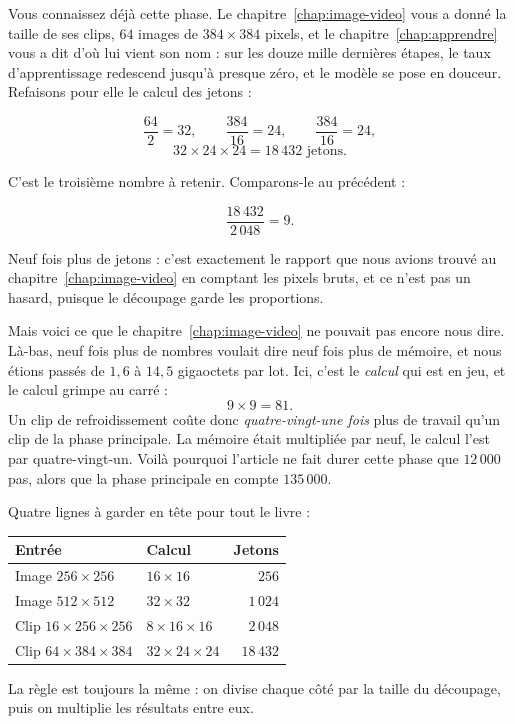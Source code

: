 \begin{exemple}
Vous connaissez déjà cette phase. Le chapitre~\ref{chap:image-video} vous a
donné la taille de ses clips, $64$ images de $384 \times 384$ pixels, et le
chapitre~\ref{chap:apprendre} vous a dit d'où lui vient son nom : sur les
douze mille dernières étapes, le taux d'apprentissage redescend jusqu'à
presque zéro, et le modèle se pose en douceur. Refaisons pour elle le calcul
des jetons :

\[
  \frac{64}{2} = 32, \qquad \frac{384}{16} = 24, \qquad \frac{384}{16} = 24,
\]
\[
  32 \times 24 \times 24 = 18\,432 \text{ jetons.}
\]

C'est le troisième nombre à retenir. Comparons-le au précédent :

\[
  \frac{18\,432}{2\,048} = 9 .
\]

Neuf fois plus de jetons : c'est exactement le rapport que nous avions
trouvé au chapitre~\ref{chap:image-video} en comptant les pixels bruts, et
ce n'est pas un hasard, puisque le découpage garde les proportions.

Mais voici ce que le chapitre~\ref{chap:image-video} ne pouvait pas encore
nous dire. Là-bas, neuf fois plus de nombres voulait dire neuf fois plus de
mémoire, et nous étions passés de $1{,}6$ à $14{,}5$ gigaoctets par lot. Ici,
c'est le \emph{calcul} qui est en jeu, et le calcul grimpe au carré :
\[ 9 \times 9 = 81 . \]
Un clip de refroidissement coûte donc \emph{quatre-vingt-une fois} plus de
travail qu'un clip de la phase principale. La mémoire était multipliée par
neuf, le calcul l'est par quatre-vingt-un. Voilà pourquoi l'article ne fait
durer cette phase que $12\,000$ pas, alors que la phase principale en compte
$135\,000$.
\end{exemple}

\begin{aretenir}
Quatre lignes à garder en tête pour tout le livre :

\begin{center}
\footnotesize
\begin{tabular}{llr}
\toprule
\textbf{Entrée} & \textbf{Calcul} & \textbf{Jetons} \\
\midrule
Image $256 \times 256$        & $16 \times 16$               & $256$ \\
Image $512 \times 512$        & $32 \times 32$               & $1\,024$ \\
Clip $16 \times 256 \times 256$ & $8 \times 16 \times 16$    & $2\,048$ \\
Clip $64 \times 384 \times 384$ & $32 \times 24 \times 24$   & $18\,432$ \\
\bottomrule
\end{tabular}
\end{center}

La règle est toujours la même : on divise chaque côté par la taille du
découpage, puis on multiplie les résultats entre eux.
\end{aretenir}

